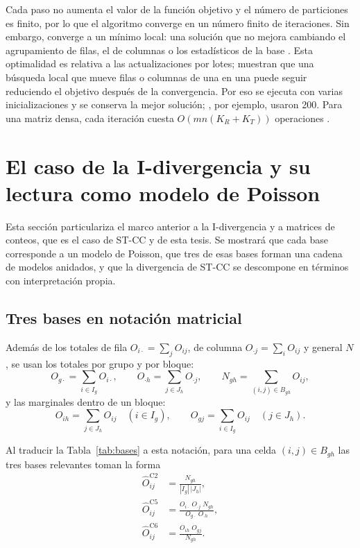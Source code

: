 Cada paso no aumenta el valor de la función objetivo y el número de particiones es
finito, por lo que el algoritmo converge en un número finito de iteraciones. Sin
embargo, converge a un mínimo local: una solución que no mejora cambiando el
agrupamiento de filas, el de columnas o los estadísticos de la base
\cite[Teorema~6]{Banerjee2007}. Esta optimalidad es relativa a las
actualizaciones por lotes; \cite{Cho2004} muestran que una búsqueda local que
mueve filas o columnas de una en una puede seguir reduciendo el objetivo después
de la convergencia. Por eso se ejecuta con varias inicializaciones y se conserva
la mejor solución; \cite{Liu2021}, por ejemplo, usaron 200. Para una matriz densa,
cada iteración cuesta $O\!\left(mn(K_R + K_T)\right)$ operaciones
\cite[Sec.~4.4]{Cho2004}.

\section{El caso de la I-divergencia y su lectura como modelo de Poisson}\label{sec:idiv-poisson}

Esta sección particulariza el marco anterior a la I-divergencia y a matrices de
conteos, que es el caso de ST-CC y de esta tesis. Se mostrará que cada base
corresponde a un modelo de Poisson, que tres de esas bases forman una cadena de
modelos anidados, y que la divergencia de ST-CC se descompone en términos con
interpretación propia.

\subsection{Tres bases en notación matricial}

Además de los totales de fila $O_{i\cdot} = \sum_j O_{ij}$, de columna
$O_{\cdot j} = \sum_i O_{ij}$ y general $N$, se usan los totales por grupo y por
bloque:
\[
  O_{g\cdot} = \sum_{i \in I_g} O_{i\cdot}, \qquad
  O_{\cdot h} = \sum_{j \in J_h} O_{\cdot j}, \qquad
  N_{gh} = \sum_{(i,j) \in B_{gh}} O_{ij},
\]
y las marginales dentro de un bloque:
\[
  O_{ih} = \sum_{j \in J_h} O_{ij} \quad (i \in I_g), \qquad
  O_{gj} = \sum_{i \in I_g} O_{ij} \quad (j \in J_h).
\]

Al traducir la Tabla~\ref{tab:bases} a esta notación, para una celda
$(i,j) \in B_{gh}$ las tres bases relevantes toman la forma
\begin{align}
  \hat{O}^{\mathrm{C2}}_{ij} &= \frac{N_{gh}}{|I_g|\,|J_h|}, \label{eq:c2}\\[4pt]
  \hat{O}^{\mathrm{C5}}_{ij} &= \frac{O_{i\cdot}\; O_{\cdot j}\; N_{gh}}{O_{g\cdot}\; O_{\cdot h}}, \label{eq:c5}\\[4pt]
  \hat{O}^{\mathrm{C6}}_{ij} &= \frac{O_{ih}\; O_{gj}}{N_{gh}}. \label{eq:c6}
\end{align}

